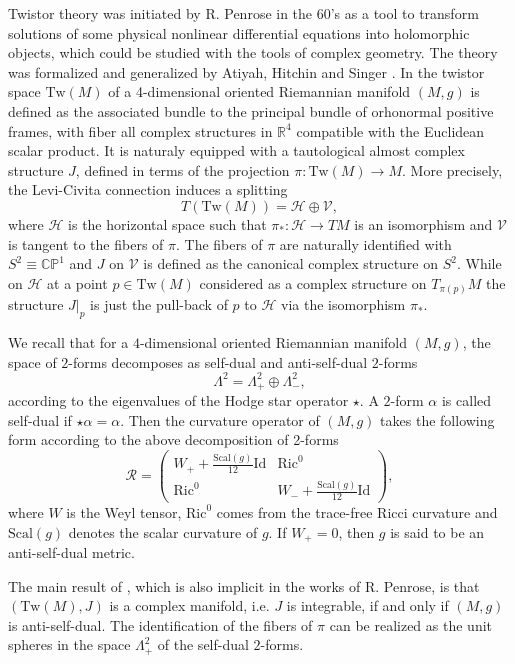 \documentclass[11pt]{amsart}
\theoremstyle{definition}
\theoremstyle{plain}
\theoremstyle{definition}
\theoremstyle{plain}
\theoremstyle{remark}
\theoremstyle{plain}
\begin{document}
Twistor theory was initiated by R. Penrose  \cite{Penrose} in the 60's as a tool to transform solutions of some physical nonlinear differential equations into holomorphic objects, which could be studied with the tools of complex geometry. The theory was formalized and generalized by Atiyah,  Hitchin and  Singer \cite{AHS}. In \cite{AHS} the twistor space ${\mbox{Tw}}(M)$ of a 4-dimensional oriented Riemannian manifold $(M, g)$  is defined as the associated bundle to the principal bundle of orhonormal positive frames, with fiber all complex structures in ${\mathbb R}^4$ compatible with the Euclidean scalar product. It is naturaly equipped with a tautological almost complex structure $J$, defined in terms of the projection $\pi: {\mbox {Tw}} (M) \rightarrow M$. More precisely, the Levi-Civita connection induces a splitting $$T({\mbox {Tw}}(M)) = {\mathcal H} \oplus {\mathcal V},$$  where ${\mathcal H}$ is the horizontal space such that $\pi_*: {\mathcal H} \rightarrow TM$ is an isomorphism and $\mathcal V$ is tangent to the fibers of $\pi$. The fibers of $\pi$ are naturally identified with $S^2\equiv {\mathbb {CP}}^1$ and $J$ on ${\mathcal V}$ is defined as the canonical complex structure on $S^2$. While on $\mathcal H$ at a point $p\in {\mbox {Tw}} (M)$ considered as a complex structure on $T_{\pi(p)}M$ the structure $J|_p$ is just the pull-back of $p$ to ${\mathcal H}$ via the isomorphism $\pi_*$.

We recall that  for a $4$-dimensional   oriented Riemannian  manifold $(M,g)$,  the space of $2$-forms 
decomposes as self-dual and anti-self-dual $2$-forms 
$$
\Lambda^2 = \Lambda^2_+ \oplus \Lambda^2_-,
$$ 
according to the eigenvalues of the Hodge star operator $\star$.  A  $2$-form $\alpha$  is called self-dual if $\star \alpha = \alpha$. Then the curvature operator of $(M, g)$ takes the following  form according to the above   decomposition of 2-forms
$$
{\mathcal R} = \left( \begin{array}{cc} W_+ +  \frac {\text{Scal} (g)}{12}  {\mbox {Id}} & \text{Ric}^0 \\[4 pt]  \text{Ric}^0  & W_- +  \frac {\text{Scal}(g)}{12}  {\mbox {Id}}  \end{array} \right ),
$$
where  $W$ is the Weyl tensor, $\text{Ric}^0$ comes from  the trace-free Ricci curvature and $\text{Scal} (g)$ denotes  the scalar curvature of $g$. If $W_+ =0$,  then $g$ is said to be an anti-self-dual metric.

 The main result of \cite {AHS},  which is also implicit in the works of R. Penrose, is that $({\mbox{Tw}}(M),J)$ is a complex manifold, i.e. $J$ is integrable, if and only if $(M,g)$ is anti-self-dual. The identification of the fibers of $\pi$ can be realized as the unit spheres in the space $\Lambda^2_+$ of the self-dual $2$-forms.
\end{document}
